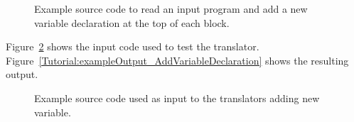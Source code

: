 

\begin{figure}[!hbp]
{\indent
{\mySmallFontSize
\begin{latexonly}
   
\end{latexonly}

\begin{htmlonly}
   
\end{htmlonly}

}
}
\caption{Example source code to read an input program and add a new variable 
         declaration at the top of each block.}
\label{Tutorial:exampleAddVariableDeclaration}
\end{figure}


Figure~\ref{Tutorial:exampleInputCode_AddVariableDeclaration} shows the
input code used to test the translator. 
Figure~\ref{Tutorial:exampleOutput_AddVariableDeclaration} shows the resulting output.

\begin{figure}[!h]
{\indent
{\mySmallFontSize


\begin{latexonly}
   
\end{latexonly}

\begin{htmlonly}
   
\end{htmlonly}

}
}
\caption{Example source code used as input to the translators adding new variable.}
\label{Tutorial:exampleInputCode_AddVariableDeclaration}
\end{figure}

